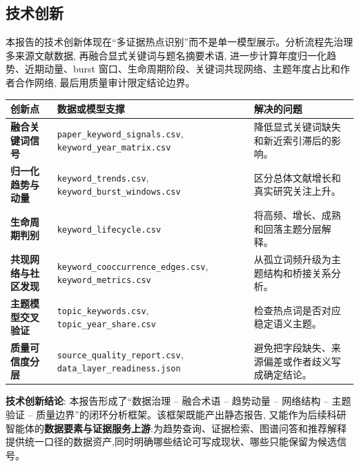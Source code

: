 \subsection{技术创新}

本报告的技术创新体现在“多证据热点识别”而不是单一模型展示。分析流程先治理多来源文献数据, 再融合显式关键词与题名摘要术语, 进一步计算年度归一化趋势、近期动量、burst 窗口、生命周期阶段、关键词共现网络、主题年度占比和作者合作网络, 最后用质量审计限定结论边界。

\begin{tableblock}
\begin{tabularx}{\textwidth}{>{\bfseries}p{40mm}X X}
\toprule
创新点 & 数据或模型支撑 & 解决的问题 \\
\midrule
融合关键词信号 & \texttt{paper\_keyword\_signals.csv}, \texttt{keyword\_year\_matrix.csv} & 降低显式关键词缺失和新近索引滞后的影响。 \\
归一化趋势与动量 & \texttt{keyword\_trends.csv}, \texttt{keyword\_burst\_windows.csv} & 区分总体文献增长和真实研究关注上升。 \\
生命周期判别 & \texttt{keyword\_lifecycle.csv} & 将高频、增长、成熟和回落主题分层解释。 \\
共现网络与社区发现 & \texttt{keyword\_cooccurrence\_edges.csv}, \texttt{keyword\_metrics.csv} & 从孤立词频升级为主题结构和桥接关系分析。 \\
主题模型交叉验证 & \texttt{topic\_keywords.csv}, \texttt{topic\_year\_share.csv} & 检查热点词是否对应稳定语义主题。 \\
质量可信度分层 & \texttt{source\_quality\_report.csv}, \texttt{data\_layer\_readiness.json} & 避免把字段缺失、来源偏差或作者歧义写成确定结论。 \\
\bottomrule
\end{tabularx}
\end{tableblock}

\begin{methodnote}
\textbf{技术创新结论}: 本报告形成了“数据治理 -- 融合术语 -- 趋势动量 -- 网络结构 -- 主题验证 -- 质量边界”的闭环分析框架。该框架既能产出静态报告, 又能作为后续科研智能体的\textbf{数据要素与证据服务上游}:为趋势查询、证据检索、图谱问答和推荐解释提供统一口径的数据资产,同时明确哪些结论可写成现状、哪些只能保留为候选信号。
\end{methodnote}

\clearpage
